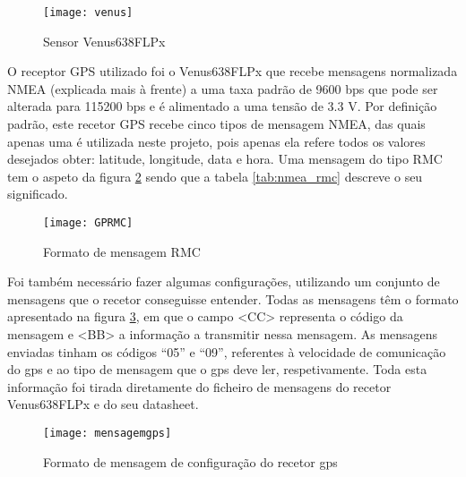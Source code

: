 \begin{figure}[hbtp]
	\centering
	\texttt{[image: venus]}
	\caption[Sensor Venus638FLPx]{Sensor Venus638FLPx \footnotemark}
	\label{fig:sensor_venus638FLPx}
\end{figure}


O receptor GPS utilizado foi o Venus638FLPx que recebe mensagens normalizada NMEA (explicada mais à frente) a uma taxa padrão de 9600 bps que pode ser alterada para 115200 bps e é alimentado a uma tensão de 3.3 V.
Por definição padrão, este recetor GPS recebe cinco tipos de mensagem NMEA, das quais apenas uma é utilizada neste projeto, pois apenas ela refere todos os valores desejados obter: latitude, longitude, data e hora.
Uma mensagem do tipo RMC tem o aspeto da figura \ref{fig:formato_de_mensagem_rmc} sendo que a tabela \ref{tab:nmea_rmc} descreve o seu significado.

\begin{figure}[hbtp]
	\centering
	\texttt{[image: GPRMC]}
	\caption{Formato de mensagem RMC}
	\label{fig:formato_de_mensagem_rmc}
\end{figure}

Foi também necessário fazer algumas configurações, utilizando um conjunto de mensagens que o recetor conseguisse entender.
Todas as mensagens têm o formato apresentado na figura \ref{fig:formato_de_mensagem_de_configuracao_do_recetor_gps}, em que o campo <CC> representa o código da mensagem e <BB> a informação a transmitir nessa mensagem.
As mensagens enviadas tinham os códigos ``05'' e ``09'', referentes à velocidade de comunicação do gps e ao tipo de mensagem que o gps deve ler, respetivamente.
Toda esta informação foi tirada diretamente do ficheiro de mensagens do recetor Venus638FLPx e do seu datasheet.

\begin{figure}[hbtp]
	\centering
	\texttt{[image: mensagemgps]}
	\caption{Formato de mensagem de configuração do recetor gps}
	\label{fig:formato_de_mensagem_de_configuracao_do_recetor_gps}
\end{figure}

